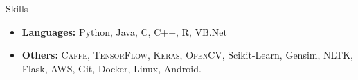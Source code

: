 \documentclass[]{mcdowellcv}
\begin{document}
	\begin{cvsection}{Skills}
		\begin{cvsubsection}{}{}{}
			\begin{itemize}
				\item \textbf{Languages:} Python, Java, C, C++, R, VB.Net
				\item \textbf{Others:} \textsc{Caffe, TensorFlow, Keras, OpenCV}, Scikit-Learn, Gensim, NLTK, Flask, AWS, Git, Docker, Linux, Android.
			\end{itemize}
		\end{cvsubsection}
	\end{cvsection}
	
\end{document}
